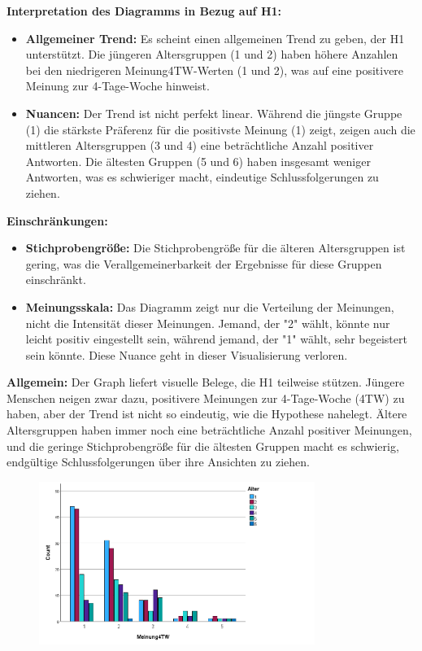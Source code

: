 \textbf{Interpretation des Diagramms in Bezug auf H1:}
\begin{itemize}
    \item \textbf{Allgemeiner Trend:  }Es scheint einen allgemeinen Trend zu geben, der H1 unterstützt. 
    Die jüngeren Altersgruppen (1 und 2) haben höhere Anzahlen bei den niedrigeren Meinung4TW-Werten 
    (1 und 2), was auf eine positivere Meinung zur 4-Tage-Woche hinweist.
    \item \textbf{Nuancen: }Der Trend ist nicht perfekt linear. Während die jüngste Gruppe (1) die stärkste 
    Präferenz für die positivste Meinung (1) zeigt, zeigen auch die mittleren Altersgruppen (3 und 4) 
    eine beträchtliche Anzahl positiver Antworten. Die ältesten Gruppen (5 und 6) haben insgesamt weniger 
    Antworten, was es schwieriger macht, eindeutige Schlussfolgerungen zu ziehen.
\end{itemize}

\textbf{Einschränkungen:}
\begin{itemize}
    \item \textbf{Stichprobengröße:  }Die Stichprobengröße für die älteren Altersgruppen ist gering, 
    was die Verallgemeinerbarkeit der Ergebnisse für diese Gruppen einschränkt.
    \item \textbf{Meinungsskala: }Das Diagramm zeigt nur die Verteilung der Meinungen, nicht die 
    Intensität dieser Meinungen. Jemand, der "2" wählt, könnte nur leicht positiv eingestellt sein, 
    während jemand, der "1" wählt, sehr begeistert sein könnte. Diese Nuance geht in dieser 
    Visualisierung verloren.
\end{itemize}

\textbf{Allgemein:}
Der Graph liefert visuelle Belege, die H1 teilweise stützen. Jüngere Menschen neigen zwar dazu, 
positivere Meinungen zur 4-Tage-Woche (4TW) zu haben, aber der Trend ist nicht so eindeutig, wie 
die Hypothese nahelegt. Ältere Altersgruppen haben immer noch eine beträchtliche Anzahl positiver 
Meinungen, und die geringe Stichprobengröße für die ältesten Gruppen macht es schwierig, endgültige 
Schlussfolgerungen über ihre Ansichten zu ziehen.

\begin{figure}[h]
    \centering
    \includegraphics[width=0.8\textwidth]{04_Artefakte/01_Abbildungen/hypothese_1/h1_graph.png}
    \caption{}
    \label{fig:h1_saeulen}
\end{figure}

